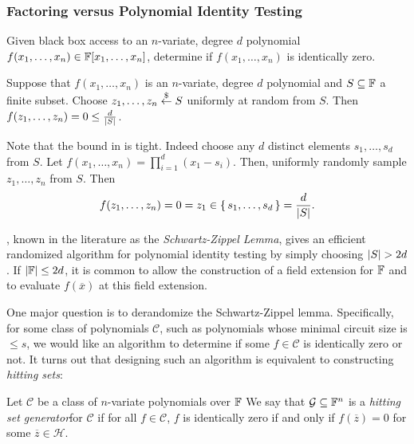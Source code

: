 \documentclass[letterpaper, 11pt]{amsart}
\newif\iffull
\begin{document}
\iffull
\subsubsection{Factoring versus Polynomial Identity Testing}

\begin{defn}\label{defn:pit}
  Given black box access to an $n$-variate, degree $d$ polynomial $f(x_1, \ldots, x_n) \in \mathbb{F}[x_1, \ldots, x_n]$, determine if $f(x_1, \ldots, x_n)$ is identically zero.
\end{defn}

\begin{lem}\label{lem:Schwartz_Zippel}
  Suppose that $f(x_1, \ldots, x_n)$ is an $n$-variate, degree $d$ polynomial and $S \subseteq \mathbb{F}$ a finite subset.
  Choose $z_1, \ldots, z_n \overset{\$}{\leftarrow} S$ uniformly at random from $S$.
  Then $\Prob{f(z_1, \ldots, z_n) = 0} \leq \frac{d}{\abs{S}}$.
\end{lem}

\begin{rmk}
  Note that the bound in  is tight.
  Indeed choose any $d$ distinct elements $s_1, \ldots, s_d$ from $S$.
  Let $f(x_1, \ldots, x_n) = \prod_{i = 1}^d (x_1 - s_i)$.
  Then, uniformly randomly sample $z_1, \ldots, z_n$ from $S$.
  Then
  \[
    \Prob{f(z_{1}, \ldots, z_{n}) = 0} = \Prob{z_{1} \in \set{s_{1}, \ldots, s_{d} }} = \frac{d}{\abs{S}}.
  \]
\end{rmk}
, known in the literature as the \emph{Schwartz-Zippel Lemma}, gives an efficient randomized algorithm for polynomial identity testing by simply choosing $\abs{S} > 2d$.
If $\abs{\mathbb{F}} \leq 2d$, it is common to allow the construction of a field extension for $\mathbb{F}$ and to evaluate $f(\overline{x})$ at this field extension.

One major question is to derandomize the Schwartz-Zippel lemma.
Specifically, for some class of polynomials $\mathcal{C}$, such as polynomials whose minimal circuit size is $\leq s$, we would like an algorithm to determine if some $f \in \mathcal{C}$ is identically zero or not.
It turns out that designing such an algorithm is equivalent to constructing \emph{hitting sets}:

\begin{defn}\label{defn:hsg}
  Let $\mathcal{C}$ be a class of $n$-variate polynomials over $\mathbb{F}$
  We say that $\mathcal{G} \subseteq \mathbb{F}^n$ is a \emph{hitting set generator}for $\mathcal{C}$ if for all $f \in \mathcal{C}$, $f$ is identically zero if and only if $f(\overline{z}) = 0$ for some $\overline{z} \in \mathcal{H}$.
\end{defn}
\end{document}
